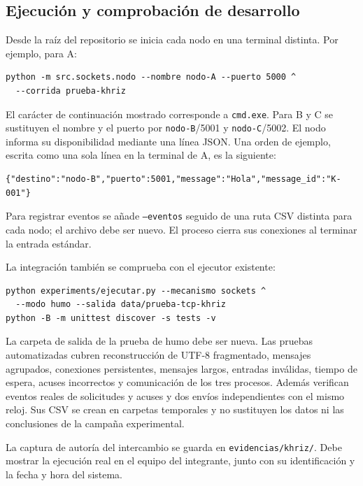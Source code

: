 \subsection{Ejecución y comprobación de desarrollo}

Desde la raíz del repositorio se inicia cada nodo en una terminal distinta.
Por ejemplo, para A:

\begin{verbatim}
python -m src.sockets.nodo --nombre nodo-A --puerto 5000 ^
  --corrida prueba-khriz
\end{verbatim}

El carácter de continuación mostrado corresponde a \texttt{cmd.exe}.
Para B y C se sustituyen el nombre y el puerto por \texttt{nodo-B}/5001 y
\texttt{nodo-C}/5002. El nodo informa su disponibilidad mediante una línea
JSON. Una orden de ejemplo, escrita como una sola línea en la terminal de A,
es la siguiente:

\begin{verbatim}
{"destino":"nodo-B","puerto":5001,"message":"Hola","message_id":"K-001"}
\end{verbatim}

Para registrar eventos se añade \texttt{--eventos} seguido de una
ruta CSV distinta para cada nodo; el archivo debe ser nuevo. El proceso
cierra sus conexiones al terminar la entrada estándar.

La integración también se comprueba con el ejecutor existente:

\begin{verbatim}
python experiments/ejecutar.py --mecanismo sockets ^
  --modo humo --salida data/prueba-tcp-khriz
python -B -m unittest discover -s tests -v
\end{verbatim}

La carpeta de salida de la prueba de humo debe ser nueva. Las pruebas
automatizadas cubren reconstrucción de UTF-8 fragmentado, mensajes
agrupados, conexiones persistentes, mensajes largos, entradas inválidas,
tiempo de espera, acuses incorrectos y comunicación de los tres procesos.
Además verifican eventos reales de solicitudes y acuses y dos envíos
independientes con el mismo reloj. Sus CSV se crean en carpetas temporales
y no sustituyen los datos ni las conclusiones de la campaña experimental.

La captura de autoría del intercambio se guarda en
\texttt{evidencias/khriz/}. Debe mostrar la ejecución real en el equipo
del integrante, junto con su identificación y la fecha y hora del sistema.
